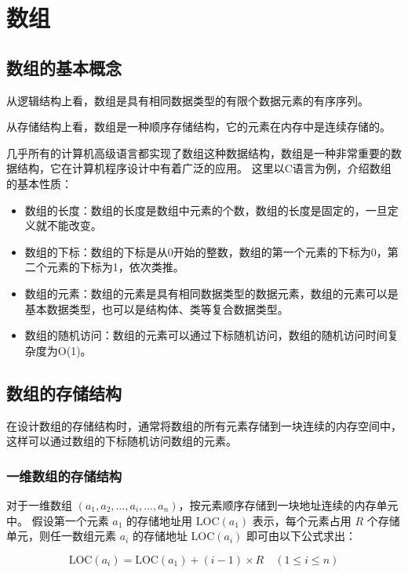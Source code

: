 \documentclass[lang=cn,newtx,10pt,scheme=chinese]{elegantbook}
\begin{document}
\section{数组}

\subsection{数组的基本概念}

从逻辑结构上看，数组是具有相同数据类型的有限个数据元素的有序序列。

从存储结构上看，数组是一种顺序存储结构，它的元素在内存中是连续存储的。

几乎所有的计算机高级语言都实现了数组这种数据结构，数组是一种非常重要的数据结构，它在计算机程序设计中有着广泛的应用。
这里以C语言为例，介绍数组的基本性质：

\begin{itemize}
  \item 数组的长度：数组的长度是数组中元素的个数，数组的长度是固定的，一旦定义就不能改变。
  \item 数组的下标：数组的下标是从0开始的整数，数组的第一个元素的下标为0，第二个元素的下标为1，依次类推。
  \item 数组的元素：数组的元素是具有相同数据类型的数据元素，数组的元素可以是基本数据类型，也可以是结构体、类等复合数据类型。
  \item 数组的随机访问：数组的元素可以通过下标随机访问，数组的随机访问时间复杂度为O(1)。
\end{itemize}
\subsection{数组的存储结构}

在设计数组的存储结构时，通常将数组的所有元素存储到一块连续的内存空间中，这样可以通过数组的下标随机访问数组的元素。
\subsubsection{一维数组的存储结构}

对于一维数组 $(a_1, a_2, \dots, a_i, \dots, a_n)$，按元素顺序存储到一块地址连续的内存单元中。  
假设第一个元素 $a_1$ 的存储地址用 $\text{LOC}(a_1)$ 表示，每个元素占用 $R$ 个存储单元，则任一数组元素 $a_i$ 的存储地址 $\text{LOC}(a_i)$ 即可由以下公式求出：

\begin{equation}
    \text{LOC}(a_i) = \text{LOC}(a_1) + (i - 1) \times R \quad (1 \leq i \leq n)
\end{equation}
\end{document}
